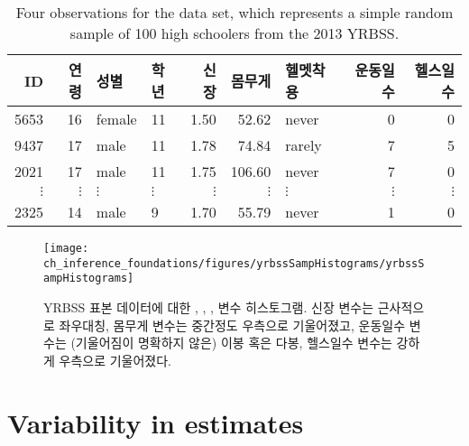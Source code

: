 \begin{table}
\centering
\begin{tabular}{rrllrrlrr}
  \hline
ID & 연령 & 성별 & 학년 & 신장 & 몸무게 & 헬멧착용 & 운동일수 & 헬스일수 \\ 
  \hline
5653 &  16 & female & 11 & 1.50 & 52.62 & never &   0 &   0 \\ 
  9437 &  17 & male & 11 & 1.78 & 74.84 & rarely &   7 &   5 \\ 
  2021 &  17 & male & 11 & 1.75 & 106.60 & never &   7 &   0 \\ 
  $\vdots$ & $\vdots$ & $\vdots$ & $\vdots$ & $\vdots$ & $\vdots$ & $\vdots$ & $\vdots$ & $\vdots$ \\
  2325 &  14 & male & 9 & 1.70 & 55.79 & never &   1 &   0 \\ 
   \hline
\end{tabular}
\caption{Four observations for the  data set, which represents a simple random sample of 100 high schoolers from the 2013 YRBSS.}
\label{yrbssSampDF}
\end{table}

\begin{figure}
\centering
\texttt{[image: ch\_inference\_foundations/figures/yrbssSampHistograms/yrbssSampHistograms]} 
\caption{ YRBSS 표본 데이터에 대한 , , ,  변수 히스토그램. 신장  변수는 근사적으로 좌우대칭, 몸무게  변수는 중간정도 우측으로 기울어졌고, 운동일수  변수는 (기울어짐이 명확하지 않은) 이봉 혹은 다봉, 헬스일수  변수는 강하게 우측으로 기울어졌다.}
\label{yrbssSampHistograms}
\end{figure}


\section[추정값에 내재하는 변동성]{Variability in estimates }
\label{variabilityInEstimates}

